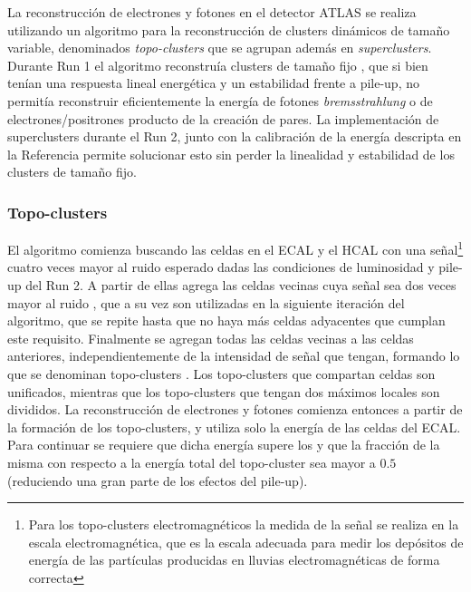 La reconstrucción de electrones y fotones en el detector ATLAS se realiza utilizando un algoritmo para la reconstrucción de clusters dinámicos de tamaño variable, denominados \textit{topo-clusters} que se agrupan además en \textit{superclusters}\cite{EGAM-2018-01}. Durante Run 1 el algoritmo reconstruía clusters de tamaño fijo \cite{PERF-2013-04, PERF-2013-05, Lampl:1099735}, que si bien tenían una respuesta lineal energética y un estabilidad frente a pile-up, no permitía reconstruir eficientemente la energía de fotones \textit{bremsstrahlung} o de electrones/positrones producto de la creación de pares. La implementación de superclusters durante el Run 2, junto con la calibración de la energía descripta en la Referencia \cite{PERF-2017-03} permite solucionar esto sin perder la linealidad y estabilidad de los clusters de tamaño fijo.

\subsubsection{Topo-clusters}

El algoritmo comienza buscando las celdas en el ECAL y el HCAL con una señal\footnote{Para los topo-clusters electromagnéticos la medida de la señal se realiza en la escala electromagnética, que es la escala adecuada para medir los depósitos de energía de las partículas producidas en lluvias electromagnéticas de forma correcta} 
cuatro veces mayor al ruido esperado dadas las condiciones de luminosidad y pile-up del Run 2. A partir de ellas agrega las celdas vecinas cuya señal sea dos veces mayor al ruido
, que a su vez son utilizadas en la siguiente iteración del algoritmo, que se repite hasta que no haya más celdas adyacentes que cumplan este requisito. Finalmente se agregan todas las celdas vecinas a las celdas anteriores, independientemente de la intensidad de señal que tengan, formando lo que se denominan topo-clusters \cite{PERF-2014-07, Lampl:1099735}. Los topo-clusters que compartan celdas son unificados, mientras que los topo-clusters que tengan dos máximos locales son divididos. La reconstrucción de electrones y fotones comienza entonces a partir de la formación de los topo-clusters, y utiliza solo la energía de las celdas del ECAL. Para continuar se requiere que dicha energía supere los  y que la fracción de la misma con respecto a la energía total del topo-cluster sea mayor a $0.5$ (reduciendo una gran parte de los efectos del pile-up).  


